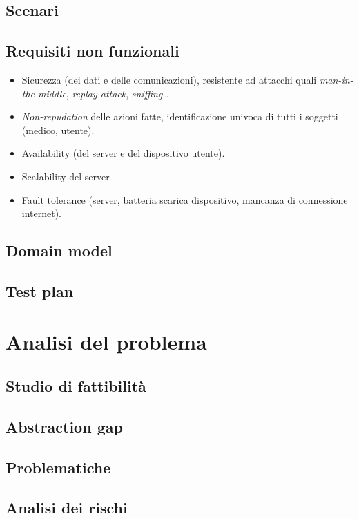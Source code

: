 \documentclass[a4paper,12pt]{report}
\begin{document}
\section{Scenari}

\section{Requisiti non funzionali}
\begin{itemize}
	\item Sicurezza (dei dati e delle comunicazioni), resistente ad attacchi quali \emph{man-in-the-middle}, \emph{replay attack}, \emph{sniffing}\dots 
	\item \emph{Non-repudation} delle azioni fatte, identificazione univoca di tutti i soggetti (medico, utente). 
	\item Availability (del server e del dispositivo utente).
	\item Scalability del server
	\item Fault tolerance (server, batteria scarica dispositivo, mancanza di connessione internet).
\end{itemize}

\section{Domain model}

\section{Test plan}

\chapter{Analisi del problema}

\section{Studio di fattibilità}

\section{Abstraction gap}

\section{Problematiche}

\section{Analisi dei rischi}
\end{document}
